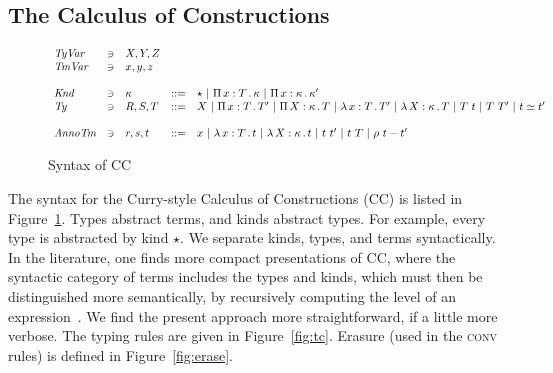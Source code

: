 \documentclass{article}
\begin{document}
\subsection{The Calculus of Constructions}

\begin{figure}
\[
\begin{array}{lllll}
  \textit{TyVar} & \ni & X,Y,Z & \ &\ \\
  \textit{TmVar} & \ni & x,y,z & \ &\ \\\\
  \textit{Knd} & \ni & \kappa & ::= & \star\ |\ \Pia{x}{T}{\kappa}\ |\ \Pia{x}{\kappa}{\kappa'} \\
  \textit{Ty} & \ni & R,S,T & ::= &
     X \ | \ \Pia{x}{T}{T'}\ |\ \Pia{X}{\kappa}{T}\ |\ \tlam{x}{T}{T'} \ |\ \tlam{X}{\kappa}{T}\ |\ T\ t\ |\ T\ T' \ |\ t \simeq t' \\\\
  \textit{AnnoTm} & \ni & r,s,t & ::= & x \ |\ \tlam{x}{T}{t}\ | \ \tlam{X}{\kappa}{t}\ |\ t\ t'\ |\ t\ T \ |\ \rho\ t - t'
\end{array}
\]
\caption{Syntax of CC}
\label{fig:ccsyn}
\end{figure}

The syntax for the Curry-style Calculus of Constructions (CC) is
listed in Figure~\ref{fig:ccsyn}.  Types abstract terms, and kinds
abstract types.  For example, every type is abstracted by kind
$\star$.  We separate kinds, types, and terms syntactically.  In the
literature, one finds more compact presentations of CC, where the
syntactic category of terms includes the types and kinds, which must
then be distinguished more semantically, by recursively computing the
level of an expression~\cite{B92}.  We  find the present
approach more straightforward, if a little more verbose.
The typing rules are given in Figure~\ref{fig:tc}.  Erasure (used in
the \textsc{conv} rules) is defined in Figure~\ref{fig:erase}.
\end{document}
